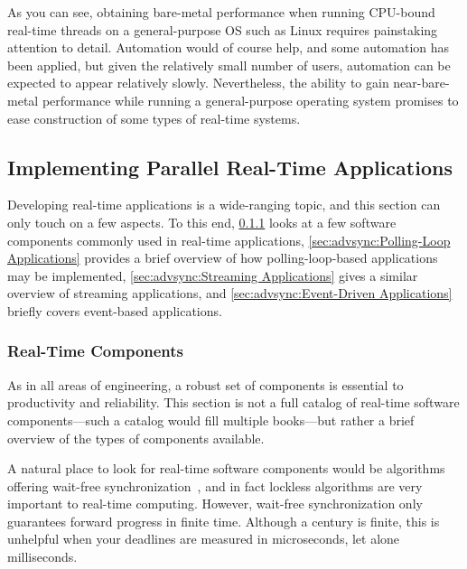 As you can see, obtaining bare-metal performance when running
CPU-bound real-time threads on a general-purpose OS such as Linux
requires painstaking attention to detail.
Automation would of course help, and some automation has been applied,
but given the relatively small number of users, automation can be
expected to appear relatively slowly.
Nevertheless, the ability to gain near-bare-metal performance while
running a general-purpose operating system promises to ease construction
of some types of real-time systems.

\subsection{Implementing Parallel Real-Time Applications}
\label{sec:advsync:Implementing Parallel Real-Time Applications}

Developing real-time applications is a wide-ranging topic, and this
section can only touch on a few aspects.
To this end,
\cref{sec:advsync:Real-Time Components}
looks at a few software components commonly used in real-time applications,
\cref{sec:advsync:Polling-Loop Applications}
provides a brief overview of how polling-loop-based applications may
be implemented,
\cref{sec:advsync:Streaming Applications}
gives a similar overview of streaming applications, and
\cref{sec:advsync:Event-Driven Applications}
briefly covers event-based applications.

\subsubsection{Real-Time Components}
\label{sec:advsync:Real-Time Components}

As in all areas of engineering, a robust set of components is essential
to productivity and reliability.
This section is not a full catalog of real-time software components---such
a catalog would fill multiple books---but rather a brief overview of the
types of components available.

A natural place to look for real-time software components would be
algorithms offering wait-free
synchronization~\cite{Herlihy91}, and in fact lockless
algorithms are very important to real-time computing.
However, wait-free synchronization only guarantees forward progress in
finite time.
Although a century is finite, this is unhelpful when your deadlines are
measured in microseconds, let alone milliseconds.

